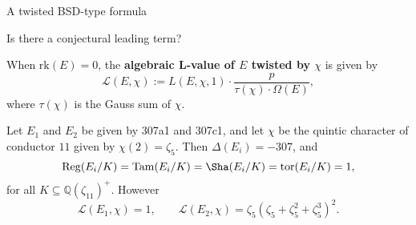 \documentclass[10pt]{beamer}
\begin{document}
\begin{frame}[t]{A twisted BSD-type formula}

Is there a conjectural leading term?

\pause

\vspace{0.5cm} When $ \mathrm{rk}(E) = 0 $, the \textbf{algebraic L-value of $ E $ twisted by $ \chi $} is given by
$$ \mathcal{L}(E, \chi) := L(E, \chi, 1) \cdot \dfrac{p}{\tau(\chi) \cdot \Omega(E)}, $$
where $ \tau(\chi) $ is the Gauss sum of $ \chi $.

\pause

\begin{example}
Let $ E_1 $ and $ E_2 $ be given by 307a1 and 307c1, and let $ \chi $ be the quintic character of conductor $ 11 $ given by $ \chi(2) = \zeta_5 $. \pause Then $ \Delta(E_i) = -307 $, and
$$ \mathrm{Reg}(E_i / K) = \mathrm{Tam}(E_i / K) = \Sha(E_i / K) = \mathrm{tor}(E_i / K) = 1, $$
for all $ K \subseteq \mathbb{Q}(\zeta_{11})^+ $. \pause However
$$ \mathcal{L}(E_1, \chi) = 1, \qquad \mathcal{L}(E_2, \chi) = \zeta_5(\zeta_5 + \zeta_5^2 + \zeta_5^3)^2. $$
\end{example}

\end{frame}
\end{document}
